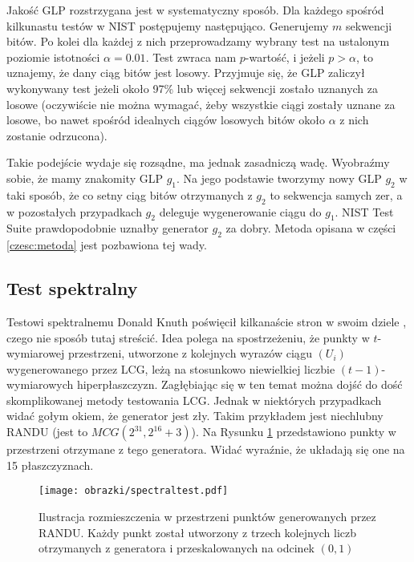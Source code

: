 \documentclass[a4paper,11pt,twoside]{book}
\theoremstyle{definition}
\begin{document}
Jakość GLP rozstrzygana jest w systematyczny sposób. Dla każdego spośród kilkunastu testów w NIST postępujemy następująco. Generujemy $m$ sekwencji bitów. Po kolei dla każdej z nich przeprowadzamy wybrany test na ustalonym poziomie istotności $\alpha = 0.01$. Test zwraca nam $p$-wartość, i jeżeli $p > \alpha$, to uznajemy, że dany ciąg bitów jest losowy. Przyjmuje się, że GLP zaliczył wykonywany test jeżeli około 97\% lub więcej sekwencji zostało uznanych za losowe (oczywiście nie można wymagać, żeby wszystkie ciągi zostały uznane za losowe, bo nawet spośród idealnych ciągów losowych bitów około $\alpha$ z nich zostanie odrzucona).

Takie podejście wydaje się rozsądne, ma jednak zasadniczą wadę. Wyobraźmy sobie, że mamy znakomity GLP $g_1$. Na jego podstawie tworzymy nowy GLP $g_2$ w taki sposób, że co setny ciąg bitów otrzymanych z $g_2$ to sekwencja samych zer, a w pozostałych przypadkach $g_2$ deleguje wygenerowanie ciągu do $g_1$. NIST Test Suite prawdopodobnie uznałby generator $g_2$ za dobry. Metoda opisana w części \ref{czesc:metoda} jest pozbawiona tej wady.

\subsection*{Test spektralny}
Testowi spektralnemu Donald Knuth poświęcił kilkanaście stron w swoim dziele \cite{knuth}, czego nie sposób tutaj streścić. Idea polega na spostrzeżeniu, że punkty w $t$-wymiarowej przestrzeni, utworzone z kolejnych wyrazów ciągu $(U_i)$ wygenerowanego przez LCG, leżą na stosunkowo niewielkiej liczbie $(t-1)$-wymiarowych hiperpłaszczyzn. Zagłębiając się w ten temat można dojść do dość skomplikowanej metody testowania LCG. Jednak w niektórych przypadkach widać gołym okiem, że generator jest zły. Takim przykładem jest niechlubny RANDU (jest to $MCG(2^{31}, 2^{16}+3)$). Na Rysunku \ref{fig:spectral} przedstawiono punkty w przestrzeni otrzymane z tego generatora. Widać wyraźnie, że układają się one na 15 płaszczyznach.
\begin{figure}[!ht]
 \centering
 \texttt{[image: obrazki/spectraltest.pdf]}
 \caption{Ilustracja rozmieszczenia w przestrzeni punktów generowanych przez RANDU. Każdy punkt został utworzony z trzech kolejnych liczb otrzymanych z generatora i przeskalowanych na odcinek $(0,1)$}
 \label{fig:spectral}
\end{figure}
\end{document}
